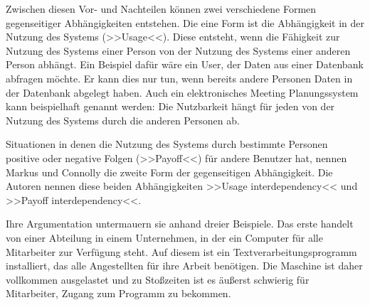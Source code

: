 \medskip Zwischen diesen Vor- und Nachteilen können zwei verschiedene Formen gegenseitiger Abhängigkeiten entstehen. Die eine Form ist die Abhängigkeit in der Nutzung des Systems (>>Usage<<). Diese entsteht, wenn die Fähigkeit zur Nutzung des Systems einer Person von der Nutzung des Systems einer anderen Person abhängt. Ein Beispiel dafür wäre ein User, der Daten aus einer Datenbank abfragen möchte. Er kann dies nur tun, wenn bereits andere Personen Daten in der Datenbank abgelegt haben. Auch ein elektronisches Meeting Planungssystem kann beispielhaft genannt werden: Die Nutzbarkeit hängt für jeden von der Nutzung des Systems durch die anderen Personen ab. 

	Situationen in denen die Nutzung des Systems durch bestimmte Personen positive oder negative Folgen (>>Payoff<<) für andere Benutzer hat, nennen Markus und Connolly die zweite Form der gegenseitigen Abhängigkeit. Die Autoren nennen diese beiden Abhängigkeiten >>Usage interdependency<< und >>Payoff interdependency<<.
	
	\medskip Ihre Argumentation untermauern sie anhand dreier Beispiele. Das erste handelt von einer Abteilung in einem Unternehmen, in der ein Computer für alle Mitarbeiter zur Verfügung steht. Auf diesem ist ein Textverarbeitungsprogramm installiert, das alle Angestellten für ihre Arbeit benötigen. Die Maschine ist daher vollkommen ausgelastet und zu Stoßzeiten ist es äußerst schwierig für Mitarbeiter, Zugang zum Programm zu bekommen. 
	
